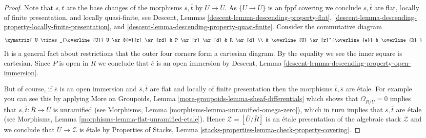 \begin{proof}
\medskip\noindent
Note that $s, t$ are the base changes of the morphisms
$\overline{s}, \overline{t}$ by $U \to \overline{U}$.
As $\{U \to \overline{U}\}$ is an fppf covering we conclude
$\overline{s}, \overline{t}$ are flat, locally of finite presentation, and
locally quasi-finite, see
Descent, Lemmas \ref{descent-lemma-descending-property-flat},
\ref{descent-lemma-descending-property-locally-finite-presentation}, and
\ref{descent-lemma-descending-property-quasi-finite}.
Consider the commutative diagram
$$
\xymatrix{
U \times_{\overline{U}} U \ar@{=}[r] \ar[rd] & P \ar[r] \ar[d] & R \ar[d] \\
& \overline{U} \ar[r]^{\overline{e}} & \overline{R}
}
$$
It is a general fact about restrictions that the outer four corners
form a cartesian diagram. By the equality we see the inner square is
cartesian. Since $P$ is open in $R$ we conclude that $\overline{e}$
is an open immersion by
Descent, Lemma \ref{descent-lemma-descending-property-open-immersion}.

\medskip\noindent
But of course, if $\overline{e}$ is an open immersion and
$\overline{s}, \overline{t}$ are flat and locally of finite presentation
then the morphisms $\overline{t}, \overline{s}$ are \'etale.
For example you can see this by applying
More on Groupoids, Lemma \ref{more-groupoids-lemma-sheaf-differentials}
which shows that $\Omega_{\overline{R}/\overline{U}} = 0$
implies that $\overline{s}, \overline{t} : \overline{R} \to \overline{U}$
is unramified (see
Morphisms, Lemma \ref{morphisms-lemma-unramified-omega-zero}),
which in turn implies that $\overline{s}, \overline{t}$ are \'etale
(see
Morphisms, Lemma \ref{morphisms-lemma-flat-unramified-etale}).
Hence $\mathcal{Z} = [\overline{U}/\overline{R}]$ is an \'etale
presentation of the algebraic stack $\mathcal{Z}$ and we conclude that
$\overline{U} \to \mathcal{Z}$ is \'etale by
Properties of Stacks, Lemma
\ref{stacks-properties-lemma-check-property-covering}.
\end{proof}
